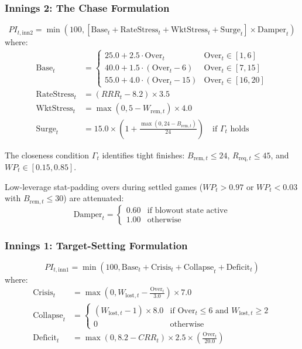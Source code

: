 \documentclass[11pt,a4paper]{article}
\begin{document}
\subsubsection{Innings 2: The Chase Formulation}
\begin{equation}
PI_{t, \text{inn2}} = \min\left(100, \left[ \text{Base}_t + \text{RateStress}_t + \text{WktStress}_t + \text{Surge}_t \right] \times \text{Damper}_t \right)
\end{equation}
where:
\begin{align}
\text{Base}_t &= \begin{cases}
25.0 + 2.5 \cdot \text{Over}_t & \text{Over}_t \in [1, 6] \\
40.0 + 1.5 \cdot (\text{Over}_t - 6) & \text{Over}_t \in [7, 15] \\
55.0 + 4.0 \cdot (\text{Over}_t - 15) & \text{Over}_t \in [16, 20]
\end{cases} \\
\text{RateStress}_t &= (RRR_t - 8.2) \times 3.5 \\
\text{WktStress}_t &= \max(0, 5 - W_{\text{rem}, t}) \times 4.0 \\
\text{Surge}_t &= 15.0 \times \left(1 + \frac{\max(0, 24 - B_{\text{rem}, t})}{24}\right) \quad \text{if } \Gamma_t \text{ holds}
\end{align}

The closeness condition $\Gamma_t$ identifies tight finishes: $B_{\text{rem}, t} \le 24$, $R_{\text{req}, t} \le 45$, and $WP_t \in [0.15, 0.85]$.

Low-leverage stat-padding overs during settled games ($WP_t > 0.97$ or $WP_t < 0.03$ with $B_{\text{rem}, t} \le 30$) are attenuated:
\begin{equation}
\text{Damper}_t = \begin{cases} 
0.60 & \text{if blowout state active} \\
1.00 & \text{otherwise}
\end{cases}
\end{equation}

\subsubsection{Innings 1: Target-Setting Formulation}
\begin{equation}
PI_{t, \text{inn1}} = \min\left(100, \text{Base}_t + \text{Crisis}_t + \text{Collapse}_t + \text{Deficit}_t \right)
\end{equation}
where:
\begin{align}
\text{Crisis}_t &= \max\left(0, W_{\text{lost}, t} - \frac{\text{Over}_t}{3.0}\right) \times 7.0 \\
\text{Collapse}_t &= \begin{cases}
(W_{\text{lost}, t} - 1) \times 8.0 & \text{if } \text{Over}_t \le 6 \text{ and } W_{\text{lost}, t} \ge 2 \\
0 & \text{otherwise}
\end{cases} \\
\text{Deficit}_t &= \max(0, 8.2 - CRR_t) \times 2.5 \times \left(\frac{\text{Over}_t}{20.0}\right)
\end{align}
\end{document}
